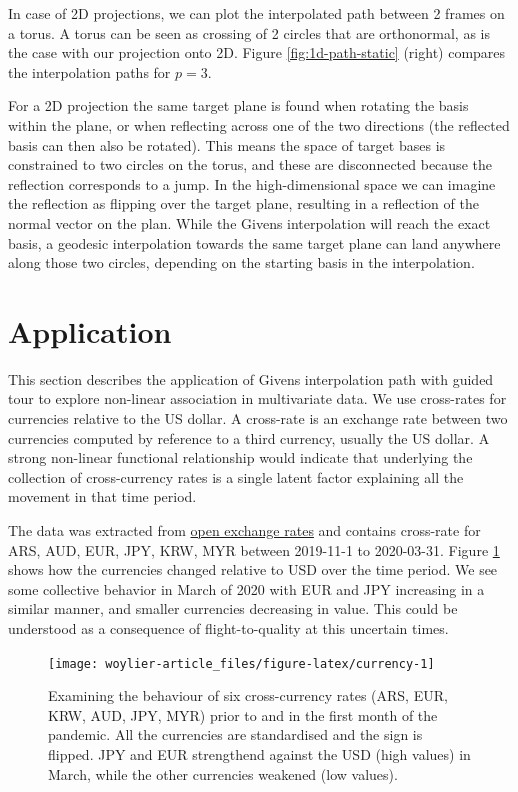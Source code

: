 In case of 2D projections, we can plot the interpolated path between 2 frames on a torus. A torus can be seen as crossing of 2 circles that are orthonormal, as is the case with our projection onto 2D. Figure \ref{fig:1d-path-static} (right) compares the interpolation paths for \(p=3\).

For a 2D projection the same target plane is found when rotating the basis within the plane, or when reflecting across one of the two directions (the reflected basis can then also be rotated). This means the space of target bases is constrained to two circles on the torus, and these are disconnected because the reflection corresponds to a jump. In the high-dimensional space we can imagine the reflection as flipping over the target plane, resulting in a reflection of the normal vector on the plan.
While the Givens interpolation will reach the exact basis, a geodesic interpolation towards the same target plane can land anywhere along those two circles, depending on the starting basis in the interpolation.

\hypertarget{application}{%
\section{Application}\label{application}}

This section describes the application of Givens interpolation path with guided tour to explore non-linear association in multivariate data. We use cross-rates for currencies relative to the US dollar. A cross-rate is an exchange rate between two currencies computed by reference to a third currency, usually the US dollar. A strong non-linear functional relationship would indicate that underlying the collection of cross-currency rates is a single latent factor explaining all the movement in that time period.

The data was extracted from \href{https://openexchangerates.org}{open exchange rates} and contains cross-rate for ARS, AUD, EUR, JPY, KRW, MYR between 2019-11-1 to 2020-03-31. Figure \ref{fig:currency} shows how the currencies changed relative to USD over the time period. We see some collective behavior in March of 2020 with EUR and JPY increasing in a similar manner, and smaller currencies decreasing in value. This could be understood as a consequence of flight-to-quality at this uncertain times.

\begin{figure}
\texttt{[image: woylier-article\_files/figure-latex/currency-1]} \caption{Examining the behaviour of six cross-currency rates (ARS, EUR, KRW, AUD, JPY, MYR) prior to and in the first month of the pandemic. All the currencies are standardised and the sign is flipped. JPY and EUR strengthend against the USD (high values) in March, while the other currencies weakened (low values).}\label{fig:currency}
\end{figure}

